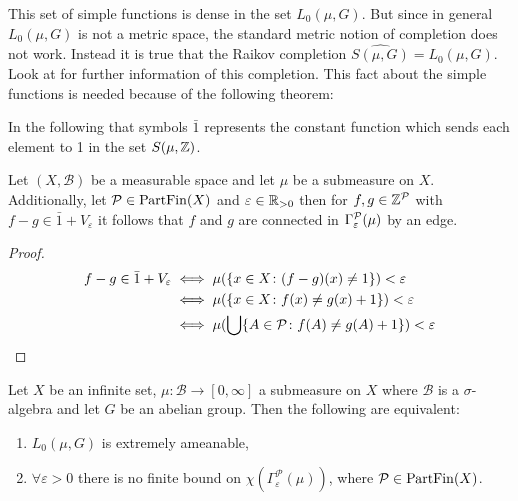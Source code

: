This set of simple functions is dense in the set $L_0(\mu, G)$. But since in general $L_0(\mu, G)$ is not a metric space, the standard metric notion of completion does not work. Instead it is true that the Raikov completion $\widehat{S(\mu, G)} = L_0(\mu, G)$. Look at \cite{} for further information of this completion. This fact about the simple functions is needed because of the following theorem:
\begin{thm}
  
\end{thm}

In the following that symbols $\bar{1}$ represents the constant function which sends each element to 1 in the set $S(\mu, \Z)$. 

\begin{lemma}\label{lem:1}
  Let $(X, \mathcal{B})$ be a measurable space and let $\mu$ be a submeasure on $X$. Additionally, let $\P \in {\rm PartFin}(X)$ and $\varepsilon \in \R_{>0}$ then for $f,g \in \Z^\P$ with $f - g \in \bar{1} + V_\varepsilon$ it follows that $f$ and $g$ are connected in $\Gamma_\varepsilon^\P(\mu)$ by an edge.
\end{lemma}

\begin{proof}
  \begin{align*}
    f - g \in \bar{1} + V_\varepsilon   &\iff \mu(\{x \in X\colon (f-g)(x) \neq 1\}) < \varepsilon \\
                                      &\iff \mu(\{x \in X\colon f(x) \neq g(x) + 1\}) < \varepsilon \\
                                      &\iff \mu(\bigcup \{A \in \P \colon f(A) \neq g(A) + 1\}) < \varepsilon
  \end{align*}
\end{proof}

\begin{lemma}
  Let $X$ be an infinite set, $\mu\colon \mathcal{B} \to [0, \infty]$ a submeasure on $X$ where $\mathcal{B}$ is a $\sigma$-algebra and let $G$ be an abelian group. Then the following are equivalent:
  \begin{enumerate}
    \item $L_0(\mu, G)$ is extremely ameanable,
    \item $\forall \varepsilon > 0$ there is no finite bound on $\chi(\Gamma_{\varepsilon}^{\mathcal{P}}(\mu))$, where $\mathcal{P} \in {\rm PartFin}(X)$.
  \end{enumerate}
\end{lemma}

